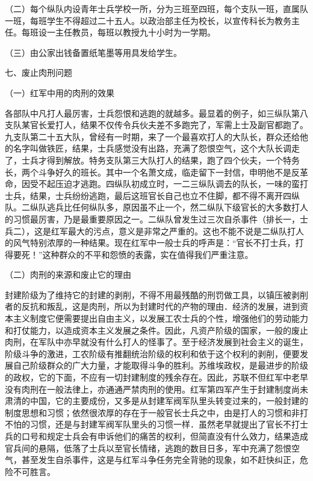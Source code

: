 （二）每个纵队内设青年士兵学校一所，分为三班至四班，每个支队一班，直属队一班，每班学生不得超过二十五人。以政治部主任为校长，以宣传科长为教务主任。每班设一主任教员，每班以教授九十小时为一学期。

（三）由公家出钱备置纸笔墨等用具发给学生。

七、废止肉刑问题

（一）红军中用的肉刑的效果

各部队中凡打人最厉害，士兵怨恨和逃跑的就越多。最显着的例子，如三纵队第八支队某官长爱打人，结果不仅传令兵伙夫差不多跑完了，军需上士及副官都跑了。九支队第二十五大队，曾经有一时期，来了一个最喜欢打人的大队长，群众还给他的名字叫做铁匠，结果，士兵感觉没有出路，充满了怨恨空气，这个大队长调走了，士兵才得到解放。特务支队第三大队打人的结果，跑了四个伙夫，一个特务长，两个斗争好久的班长。其中一个名萧文成，临走留下一封信，申明他不是反革命，因受不起压迫才逃跑。四纵队初成立时，一二三纵队调去的队长，一味的蛮打士兵，结果，士兵纷纷逃跑，最后这班官长自己也立不住脚，都不得不离开四纵队。二纵队逃兵比任何纵队多，原因虽不止一个，然二纵队下级官长的大多数打人的习惯最厉害，乃是最重要原因之一。二纵队曾发生过三次自杀事件（排长一，士兵二），这是红军最大的污点，意义是非常之严重的。这也不能不说是二纵队打人的风气特别浓厚的一种结果。现在红军中一般士兵的呼声是：“官长不打士兵，打得要死！”这种群众的不平和怨愤的表露，实在值得我们严重注意。

（二）肉刑的来源和废止它的理由

封建阶级为了维持它的封建的剥削，不得不用最残酷的刑罚做工具，以镇压被剥削者的反抗和叛乱，这是肉刑，所以为封建时代的产物的理由．经济的发展，进到资本主义制度它便需要提出自由主义，以发展工农士兵的个性，增强他们的劳动能力和打仗能力，以造成资本主义发展之条件。因此，凡资产阶级的国家，一般的废止肉刑，在军队中亦早就没有什么打人的怪事了。至于经济发展到社会主义的诞生，阶级斗争的激进，工农阶级有推翻统治阶级的权利和依于这个权利的剥削，便要发展自己阶级群众的广大力量，才能取得斗争的胜利。苏维埃政权，是最进步的阶级的政权，它的下面，不应有一切封建制度的残余存在。因此，苏联不但红军中老早没有肉刑在一般法律上，亦通通严禁肉刑的使用。红军第四军产生于封建制度尚未肃清的中国，它的主要成份，又多是从封建军阀军队里头转变过来的，一般封建的制度思想和习惯；依然很浓厚的存在于一般官长士兵之中，由是打人的习惯和非打不怕的习惯，还是与封建军阀军队里头的习惯一样．虽然老早就提出了官长不打士兵的口号和规定士兵会有申诉他们的痛苦的权利，但简直没有什么效力，结果造成官兵间的悬隔，低落了士兵以至官长情绪，逃跑的数目日多，军中充满了怨恨空气，甚至发生自杀事件，这是与红军斗争任务完全背驰的现象，如不赶快纠正，危险不可胜言。

